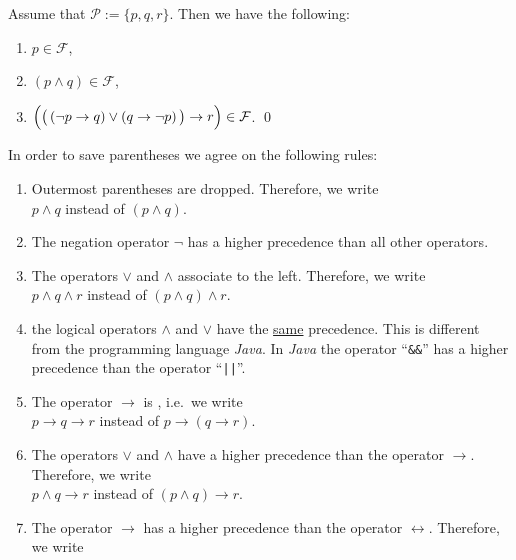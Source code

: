 \exampleEng 
Assume that $\mathcal{P} := \{ p, q, r \}$. Then we have the following:
\begin{enumerate}
\item $p \in \mathcal{F}$,
\item $(p \wedge q) \in \mathcal{F}$,
\item $\Bigl(\bigl(\,(\neg p \rightarrow q) \vee (q \rightarrow \neg p)\,\bigr) \rightarrow r\Bigr) \in \mathcal{F}$.  \qed
\end{enumerate}

\noindent
In order to save parentheses we agree on the following rules:
\begin{enumerate}
\item Outermost parentheses are dropped.  Therefore, we write \\[0.2cm]
      \hspace*{1.3cm} $p \wedge q$ \quad instead of \quad $(p \wedge q)$.
\item The negation operator $\neg$ has a higher precedence than all other operators. 
\item The operators  $\vee$ and $\wedge$ associate to the left.  Therefore, we write 
      \\[0.2cm]
      \hspace*{1.3cm} $p \wedge q \wedge r$ \quad instead of \quad $(p \wedge q) \wedge r$.
\item \underline{\textbf{}} the logical operators 
      $\wedge$ and $\vee$ have the \underline{same} precedence.  This is different from the programming
      language  \textsl{Java}.  In \textsl{Java} the operator ``\texttt{\&\&}'' has a higher precedence than
      the  operator ``\texttt{||}''.
\item The operator $\rightarrow$ is \underline{}\underline{}, i.e.~we write \\[0.2cm]
      \hspace*{1.3cm} $p \rightarrow q \rightarrow r$ \quad instead of \quad $p \rightarrow (q \rightarrow r)$.
\item The operators  $\vee$ and $\wedge$ have a higher precedence than the operator $\rightarrow$.  Therefore,
      we write \\[0.2cm]
      \hspace*{1.3cm} $p \wedge q \rightarrow r$ \quad instead of \quad $(p \wedge q) \rightarrow r$.
\item The operator $\rightarrow$ has a higher precedence than the operator $\leftrightarrow$.  Therefore, we write \\[0.2cm]

\end{enumerate}
